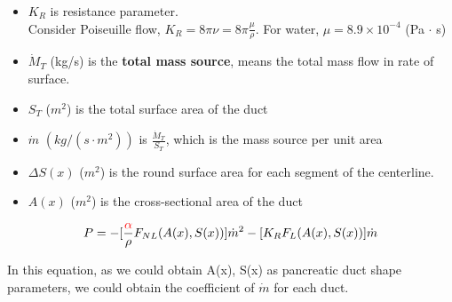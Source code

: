 \documentclass{beamer}
\begin{document}
\begin{frame}
                \begin{itemize}
                    \item $K_R$ is resistance parameter.\\
                     Consider Poiseuille flow, $K_R = 8\pi \nu= 8\pi \frac{\mu}{\rho}$. For water, $\mu = 8.9 \times 10^{-4}$ (Pa $\cdot$ s)
                    \item $\dot{M}_T$ (kg/s) is the \textbf{total mass source}, 
                    means the total mass flow in rate of surface.
                    \item $S_T$ ($m^2$) is the total surface area of the duct
                    \item $\dot{m}$ $(kg/(s \cdot m^2))$ is $\frac{\dot{M}_T}{S_T}$, which is the mass source per unit area
                    \item $\Delta S(x)$ ($m^2$) is the round surface area for each segment of the centerline.
                    \item $A(x)$ ($m^2$) is the cross-sectional area of the duct
                \end{itemize}
                
                
                \begin{equation}
                    P = 
                    - [\frac{\textcolor{red}{\alpha}}{\rho} F_{NL}(A(x), S(x))] \dot{m} ^2 
                    - [K_R F_{L}(A(x), S(x))] \dot{m}
                \end{equation}
                
                In this equation, as we could obtain A(x), S(x) as pancreatic duct shape parameters, we could obtain the coefficient of $\dot{m}$ for each duct.
                

\end{frame}
\end{document}
